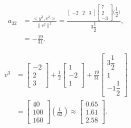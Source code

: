 \documentclass[letterpaper]{article}
\begin{document}
$$\begin{aligned} a_{32} &= \frac{<y^3, v^2>}{\|v^2\|^2} = \frac{\left[\begin{array}{ccc} -2& 2& 3\end{array}\right]\begin{bmatrix} 7\\ 2\\ -3\end{bmatrix}\bigg(\dfrac{1}{2}\bigg)}{3\dfrac{1}{2}},\\ &= -\frac{19}{31}.\end{aligned}$$

$$\begin{aligned}v^3 &= \begin{bmatrix} -2\\ 2\\ 3\end{bmatrix} + \frac{1}{2}\begin{bmatrix} 1\\ -2\\ 1\end{bmatrix} + \frac{19}{31}\begin{bmatrix} 3\dfrac{1}{2}\\[2ex] 1\\[2ex] -1\dfrac{1}{2}\end{bmatrix}\\
&=\begin{bmatrix} 40\\ 100\\ 160\end{bmatrix}(\frac{1}{62})\approx\begin{bmatrix} 0.65\\ 1.61\\ 2.58\end{bmatrix}.\end{aligned}$$
\end{document}
